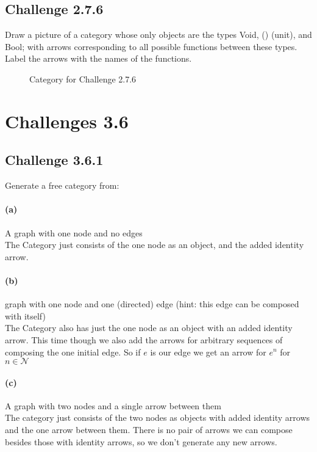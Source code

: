 \documentclass[11pt]{article}
\begin{document}
    \subsection*{Challenge 2.7.6}
        Draw a picture of a category whose only objects are the types
        Void, () (unit), and Bool; with arrows corresponding to all possible
        functions between these types. Label the arrows with the
        names of the functions.\\
        \begin{figure*}
            \centering
            \caption{Category for Challenge 2.7.6}
        \end{figure*}


\section*{Challenges 3.6}
    \subsection*{Challenge 3.6.1}
        Generate a free category from:
        \paragraph*{(a)} A graph with one node and no edges \\
            The Category just consists of the one node as an object, and the added identity arrow. 
        \paragraph*{(b)} graph with one node and one (directed) edge (hint: this
        edge can be composed with itself) \\
            The Category also has just the one node as an object with an added identity arrow. This time though we also add the arrows for arbitrary sequences of composing the one initial edge. So if $e$ is our edge we get an arrow for $e^n$ for $n \in \mathcal{N}$
        \paragraph*{(c)} A graph with two nodes and a single arrow between them \\
            The category just consists of the two nodes as objects with added identity arrows and the one arrow between them. There is no pair of arrows we can compose besides those with identity arrows, so we don't generate any new arrows. 
\end{document}
